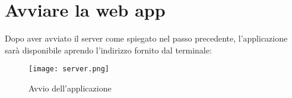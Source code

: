 \section{Avviare la web app}
Dopo aver avviato il server come spiegato nel passo precedente, l'applicazione sarà disponibile aprendo l'indirizzo fornito dal terminale:
\begin{figure}[ht]
	\centering
	\texttt{[image: server.png]}
	\caption{Avvio dell'applicazione}
  \end{figure}
